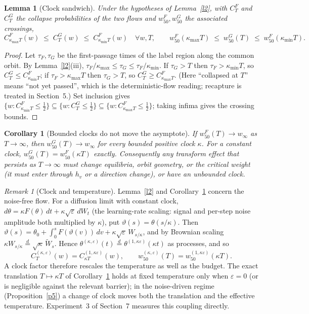 \documentclass[11pt]{article}
\newtheorem{lemma}{Lemma}
\newtheorem{corollary}{Corollary}
\theoremstyle{definition}
\theoremstyle{remark}
\newtheorem{remark}{Remark}
\newcommand{\wfifty}{w_{50}}
\begin{document}
\begin{lemma}[Clock sandwich]\label{l3}
Under the hypotheses of Lemma~\ref{l2}, with $C^F_T$ and $C^G_T$ the collapse probabilities of the two flows and $\wfifty^{F},\wfifty^{G}$ the associated crossings,
\[
C^F_{\kappa_{\max}T}(w)\;\le\;C^G_T(w)\;\le\;C^F_{\kappa_{\min}T}(w)\quad\forall w,T,
\qquad
\wfifty^{F}(\kappa_{\max}T)\;\le\;\wfifty^{G}(T)\;\le\;\wfifty^{F}(\kappa_{\min}T).
\]
\end{lemma}
\begin{proof}
Let $\tau_F,\tau_G$ be the first-passage times of the label region along the common orbit. By Lemma~\ref{l2}(iii), $\tau_F/\kappa_{\max}\le\tau_G\le\tau_F/\kappa_{\min}$. If $\tau_G>T$ then $\tau_F>\kappa_{\min}T$, so $C^G_T\le C^F_{\kappa_{\min}T}$; if $\tau_F>\kappa_{\max}T$ then $\tau_G>T$, so $C^G_T\ge C^F_{\kappa_{\max}T}$. (Here ``collapsed at $T$'' means ``not yet passed'', which is the deterministic-flow reading; recapture is treated in Section~5.) Set inclusion gives $\{w:C^F_{\kappa_{\min}T}\le\frac12\}\subseteq\{w:C^G_T\le\frac12\}\subseteq\{w:C^F_{\kappa_{\max}T}\le\frac12\}$; taking infima gives the crossing bounds.
\end{proof}

\begin{corollary}[Bounded clocks do not move the asymptote]\label{c1}
If $\wfifty^F(T)\to w_\infty$ as $T\to\infty$, then $\wfifty^G(T)\to w_\infty$ for every bounded positive clock $\kappa$. For a constant clock, $\wfifty^G(T)=\wfifty^F(\kappa T)$ exactly. Consequently any transform effect that persists as $T\to\infty$ must change equilibria, orbit geometry, or the critical weight (it must enter through $h_v$ or a direction change), or have an unbounded clock.
\end{corollary}

\begin{remark}[Clock and temperature]\label{rm_noise}
Lemma~\ref{l2} and Corollary~\ref{c1} concern the noise-free flow. For a diffusion limit with constant clock, $d\theta=\kappa F(\theta)\,dt+\kappa\sqrt\varepsilon\,dW_t$ (the learning-rate scaling: signal and per-step noise amplitude both multiplied by $\kappa$), put $\vartheta(s)=\theta(s/\kappa)$. Then $\vartheta(s)=\theta_0+\int_0^sF(\vartheta(v))\,dv+\kappa\sqrt\varepsilon\,W_{s/\kappa}$, and by Brownian scaling $\kappa W_{s/\kappa}\overset d=\sqrt\kappa\,\widetilde W_s$. Hence $\theta^{(\kappa,\varepsilon)}(t)\overset d=\theta^{(1,\kappa\varepsilon)}(\kappa t)$ as processes, and so
\[
C^{(\kappa,\varepsilon)}_T(w)=C^{(1,\kappa\varepsilon)}_{\kappa T}(w),\qquad \wfifty^{(\kappa,\varepsilon)}(T)=\wfifty^{(1,\kappa\varepsilon)}(\kappa T).
\]
A clock factor therefore rescales the temperature as well as the budget. The exact translation $T\mapsto\kappa T$ of Corollary~\ref{c1} holds at fixed temperature only when $\varepsilon=0$ (or is negligible against the relevant barrier); in the noise-driven regime (Proposition~\ref{p5}) a change of clock moves both the translation and the effective temperature. Experiment~3 of Section~7 measures this coupling directly.
\end{remark}
\end{document}
